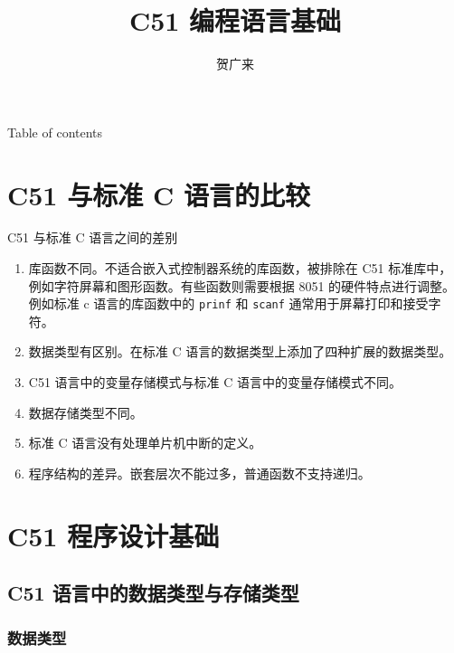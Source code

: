 \documentclass{beamer}
\begin{document}
\title{C51 编程语言基础}
\author{贺广来}

\begin{frame}
    \titlepage
\end{frame}

\begin{frame}{Table of contents}
    \tableofcontents
\end{frame}


\section{C51 与标准 C 语言的比较}
\begin{frame}{C51 与标准 C 语言之间的差别}
    \begin{enumerate}
        \item
            库函数不同。不适合嵌入式控制器系统的库函数，被排除在 C51
            标准库中，例如字符屏幕和图形函数。有些函数则需要根据 8051
            的硬件特点进行调整。例如标准 c 语言的库函数中的 \texttt{prinf} 和
            \texttt{scanf} 通常用于屏幕打印和接受字符。
            \pause
        \item
            数据类型有区别。在标准 C 语言的数据类型上添加了四种扩展的数据类型。
            \pause
        \item
            C51 语言中的变量存储模式与标准 C 语言中的变量存储模式不同。
            \pause
        \item
            数据存储类型不同。
            \pause
        \item
            标准 C 语言没有处理单片机中断的定义。
            \pause
        \item
            程序结构的差异。嵌套层次不能过多，普通函数不支持递归。
    \end{enumerate}
\end{frame}

\section{C51 程序设计基础}

\subsection{C51 语言中的数据类型与存储类型}

\subsubsection{数据类型}
\end{document}

